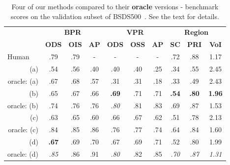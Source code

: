 \begin{table}[htbp]
\renewcommand{\arraystretch}{1.3}
\centering
\scriptsize
\begin{tabular}{l|c|c|c||c|c|c||c|c|c|}
\cline{2-10} %
\multirow{2}{*}{} & \multicolumn{3}{c||}{\textbf{BPR}} & \multicolumn{3}{c||}{\textbf{VPR}}& \multicolumn{3}{c|}{\textbf{Region}}\\
\cline{2-10}
& \textbf{ODS}  & \textbf{OIS} & \textbf{AP} %
& \textbf{ODS} & \textbf{OSS} & \textbf{AP} %
& \textbf{SC} & \textbf{PRI} & \textbf{VoI} \\
\hline
\multicolumn{1}{|l|}{Human} & .79 & .79 & - & - & - & - & .72 & .88 & 1.17 \\ %
\hline
\hline
\multicolumn{1}{|r|}{(a)} & .54 & .56 & .40 & .40 & .40 & .25 & .34 & .55 & 2.45 \\
\multicolumn{1}{|r|}{oracle: (a)} & .67 & .68 & .57 & .31 & .31 & .18 & .33 & .49 & 2.43 \\
\hline
\multicolumn{1}{|r|}{(b)} & .65 & .67 & .66 & {\bf .69} & .71 & .71 & {\bf .54} & {\bf .80} & {\bf 1.96} \\
\multicolumn{1}{|r|}{oracle: (b)} & .74 & .76 & .76 & {\it .80} & .81 & .83 & .69 & .87 & 1.53 \\
\hline
\multicolumn{1}{|r|}{(c)} & .63 & .65 & .60 & .66 & .67 & .62 & .51 & .78 & 2.13 \\
\multicolumn{1}{|r|}{oracle: (c)} & .84 & .85 & .86 & .76 & .77 & .74 & .64 & .84 & 1.60 \\
\hline
\multicolumn{1}{|r|}{(d)} & {\bf .67} & .69 & .70 & .67 & .69 & .71 & .52 & .80 & 1.99 \\
\multicolumn{1}{|r|}{oracle: (d)} & {\it .85} & .86 & .91 & {\it .80} & .82 & .85 & {\it .70} & {\it .87} & {\it 1.31} \\
\hline
\end{tabular}
\caption[Four of our methods compared to their oracle versions]{Four of our methods compared to their {\bf oracle} versions - benchmark scores on the validation subset of BSDS500~\cite{BSDS500resources}. See the text for details.}
\label{tab:oracle}
\end{table}


